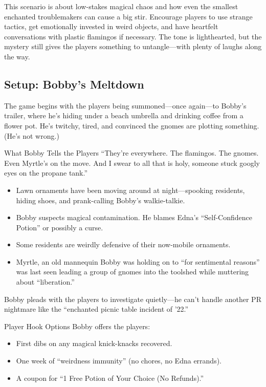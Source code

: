 This scenario is about low-stakes magical chaos and how even the smallest enchanted troublemakers can cause a big stir. Encourage players to use strange tactics, get emotionally invested in weird objects, and have heartfelt conversations with plastic flamingos if necessary. The tone is lighthearted, but the mystery still gives the players something to untangle—with plenty of laughs along the way.

\subsection{Setup: Bobby’s Meltdown}

The game begins with the players being summoned—once again—to Bobby’s trailer, where he’s hiding under a beach umbrella and drinking coffee from a flower pot. He’s twitchy, tired, and convinced the gnomes are plotting something. (He’s not wrong.)

\begin{Example}{What Bobby Tells the Players}
    “They’re everywhere. The flamingos. The gnomes. Even Myrtle’s on the move. And I swear to all that is holy, someone stuck googly eyes on the propane tank.”
\end{Example}

\begin{itemize}
    \item Lawn ornaments have been moving around at night—spooking residents, hiding shoes, and prank-calling Bobby’s walkie-talkie.
    \item Bobby suspects magical contamination. He blames Edna’s “Self-Confidence Potion” or possibly a curse.
    \item Some residents are weirdly defensive of their now-mobile ornaments.
    \item Myrtle, an old mannequin Bobby was holding on to ``for sentimental reasons'' was last seen leading a group of gnomes into the toolshed while muttering about “liberation.”
\end{itemize}

Bobby pleads with the players to investigate quietly—he can’t handle another PR nightmare like the “enchanted picnic table incident of ’22.”

\begin{CommentBox}{Player Hook Options}
    Bobby offers the players:
    \begin{itemize}
        \item First dibs on any magical knick-knacks recovered.
        \item One week of “weirdness immunity” (no chores, no Edna errands).
        \item A coupon for “1 Free Potion of Your Choice (No Refunds).”
    \end{itemize}
\end{CommentBox}

